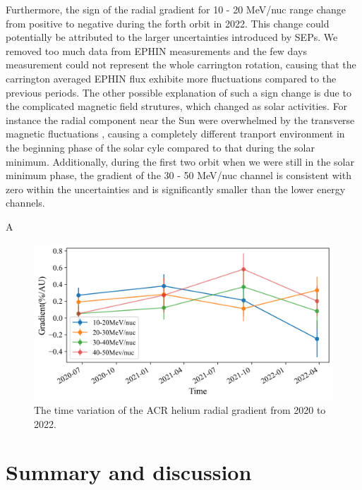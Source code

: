 Furthermore, the sign of the radial gradient for 10 - 20 MeV/nuc range change from positive to negative during the forth orbit in 2022. This change could potentially be attributed to the larger uncertainties introduced by \acp{SEP}. We removed too much data from \ac{EPHIN} measurements and the few days measurement could not represent the whole carrington rotation, causing that the carrington averaged \ac{EPHIN} flux exhibite more fluctuations compared to the previous periods. The other possible explanation of such a sign change is due to the complicated magnetic field strutures, which changed as solar activities. For instance the radial component near the Sun were overwhelmed by the transverse magnetic fluctuations \citep{Rankin2022ApJ}, causing a completely different tranport environment in the beginning phase of the solar cyle compared to that during the solar minimum.
Additionally, during the first two orbit when we were still in the solar minimum phase, the gradient of the 30 - 50 MeV/nuc channel is consistent with zero within the uncertainties and is significantly smaller than the lower energy channels. 

A
\begin{figure}[!htb]
    \centering
    \includegraphics[width = \textwidth, height = 0.3\textheight]{images/ACR/timevariation_normalmask_gradient.png}
    \caption[The time variation of the \ac{ACR} helium radial gradient]{The time variation of the \ac{ACR} helium radial gradient from 2020 to 2022. }
    \label{fig:radialgradient_time_variation}
\end{figure}



\section{ Summary and discussion}

